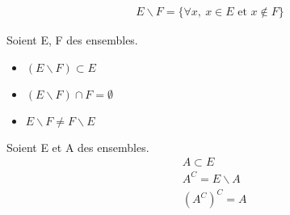 \begin{definitionbox}
    \begin{definition}
	\begin{align*}
		E \backslash F = \{\forall x,\ x \in E \text{ et } x \notin F \}
	\end{align*}
\end{definition}
\end{definitionbox}

\begin{leftstroke}
\begin{remarque}Soient E, F des ensembles.
	\begin{itemize}
		\item $(E \backslash F) \subset E$
		\item $(E \backslash F) \cap F = \emptyset$
		\item $E \backslash F \neq F \backslash E$
	\end{itemize}
\end{remarque}
\end{leftstroke}

\begin{leftstroke}
\begin{remarque}Soient E et A des ensembles.
	\begin{align*}
		&A \subset E \\
		&A^C = E \backslash A \\
		&(A^C)^C = A
	\end{align*}
\end{remarque}
\end{leftstroke}


